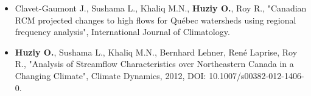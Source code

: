 \vspace{\vertspace}
\begin{itemize}

    \item Clavet-Gaumont J., Sushama L., Khaliq M.N.,
    \textbf{Huziy O.}, Roy R., "Canadian RCM projected changes to high
    flows for Québec watersheds using regional frequency analysis", International Journal of Climatology.

    \item \textbf{Huziy O.}, Sushama L., Khaliq M.N., Bernhard
    Lehner, René Laprise, Roy R., "Analysis of Streamflow Characteristics over Northeastern Canada
     in a Changing Climate", Climate Dynamics, 2012, DOI:
     10.1007/s00382-012-1406-0.

\end{itemize}
